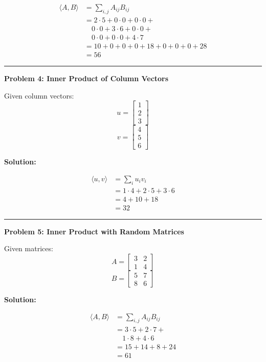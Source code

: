 \documentclass[
  letterpaper,
  DIV=11,
  numbers=noendperiod]{scrreprt}
\theoremstyle{plain}
\theoremstyle{definition}
\theoremstyle{remark}
\begin{document}
\begin{align*}
\langle A,B \rangle &= \sum_{i,j} A_{ij} B_{ij} \\
&= 2\cdot5 + 0\cdot0 + 0\cdot0 + \\
&\quad 0\cdot0 + 3\cdot6 + 0\cdot0 + \\
&\quad 0\cdot0 + 0\cdot0 + 4\cdot7 \\
&= 10 + 0 + 0 + 0 + 18 + 0 + 0 + 0 + 28 \\
&= 56
\end{align*}

\begin{center}\rule{0.5\linewidth}{0.5pt}\end{center}

\textbf{Problem 4: Inner Product of Column Vectors}

Given column vectors: \[u=\begin{bmatrix}1\\2\\3\end{bmatrix}\]
\[v=\begin{bmatrix}4\\5\\6\end{bmatrix}\]

\textbf{Solution:}

\begin{align*}
\langle u,v \rangle &= \sum_{i} u_i v_i \\
&= 1\cdot4 + 2\cdot5 + 3\cdot6 \\
&= 4 + 10 + 18 \\
&= 32
\end{align*}

\begin{center}\rule{0.5\linewidth}{0.5pt}\end{center}

\textbf{Problem 5: Inner Product with Random Matrices}

Given matrices: \[A=\begin{bmatrix}3&2\\1&4\end{bmatrix}\]
\[B=\begin{bmatrix}5&7\\8&6\end{bmatrix}\]

\textbf{Solution:}

\begin{align*}
\langle A,B \rangle &= \sum_{i,j} A_{ij} B_{ij} \\
&= 3\cdot5 + 2\cdot7 + \\
&\quad 1\cdot8 + 4\cdot6 \\
&= 15 + 14 + 8 + 24 \\
&= 61
\end{align*}
\end{document}
